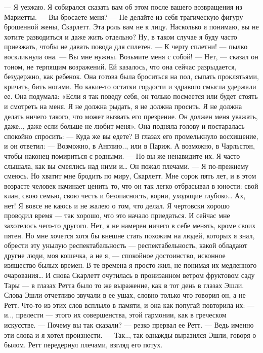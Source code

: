 — Я уезжаю. Я собирался сказать вам об этом после вашего возвращения из Мариетты.
— Вы бросаете меня?
— Не делайте из себя трагическую фигуру брошенной жены, Скарлетт. Эта роль вам не к лицу. Насколько я понимаю, вы не хотите разводиться и даже жить отдельно? Ну, в таком случае я буду часто приезжать, чтобы не давать повода для сплетен.
— К черту сплетни! — пылко воскликнула она. — Вы мне нужны. Возьмите меня с собой!
— Нет, — сказал он тоном, не терпящим возражений. Ей казалось, что она сейчас разрыдается, безудержно, как ребенок. Она готова была броситься на пол, сыпать проклятьями, кричать, бить ногами. Но какие-то остатки гордости и здравого смысла удержали ее. Она подумала: «Если я так поведу себя, он только посмеется или будет стоять и смотреть на меня. Я не должна рыдать, я не должна просить. Я не должна делать ничего такого, что может вызвать его презрение. Он должен меня уважать, даже.., даже если больше не любит меня».
Она подняла голову и постаралась спокойно спросить:
— Куда же вы едете?
В глазах его промелькнуло восхищение, и он ответил:
— Возможно, в Англию.., или в Париж. А возможно, в Чарльстон, чтобы наконец помириться с родными.
— Но вы же ненавидите их. Я часто слышала, как вы смеялись над ними и…
Он пожал плечами.
— Я по-прежнему смеюсь. Но хватит мне бродить по миру, Скарлетт. Мне сорок пять лет, и в этом возрасте человек начинает ценить то, что он так легко отбрасывал в юности: свой клан, свою семью, свою честь и безопасность, корни, уходящие глубоко… Ах, нет! Я вовсе не каюсь и не жалею о том, что делал. Я чертовски хорошо проводил время — так хорошо, что это начало приедаться. И сейчас мне захотелось чего-то другого. Нет, я не намерен ничего в себе менять, кроме своих пятен. Но мне хочется хотя бы внешне стать похожим на людей, которых я знал, обрести эту унылую респектабельность — респектабельность, какой обладают другие люди, моя кошечка, а не я, — спокойное достоинство, исконное изящество былых времен. В те времена я просто жил, не понимая их медленного очарования…
И снова Скарлетт очутилась в пронизанном ветром фруктовом саду Тары — в глазах Ретта было то же выражение, как в тот день в глазах Эшли. Слова Эшли отчетливо звучали в ее ушах, словно только что говорил он, а не Ретт. Что-то из этих слов всплыло в памяти, и она как попугай повторила их:
— и.., прелести — этого их совершенства, этой гармонии, как в греческом искусстве.
— Почему вы так сказали? — резко прервал ее Ретт. — Ведь именно эти слова и я хотел произнести.
— Так.., так однажды выразился Эшли, говоря о былом. Ретт передернул плечами, взгляд его потух.
